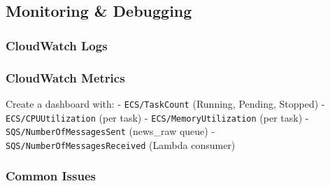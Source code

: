 \hypertarget{monitoring-debugging}{%
\subsection{Monitoring \& Debugging}}

\hypertarget{cloudwatch-logs}{%
\subsubsection{CloudWatch Logs}}

\begin{Shaded}
\begin{Highlighting}[]
  

\DataTypeTok{\textbackslash{}}
  \DataTypeTok{\textbackslash{}}
    \DataTypeTok{\textbackslash{}}
   \VariableTok{$(}  \VariableTok{)}
\end{Highlighting}
\end{Shaded}

\hypertarget{cloudwatch-metrics}{%
\subsubsection{CloudWatch Metrics}}

Create a dashboard with: - \texttt{ECS/TaskCount} (Running, Pending,
Stopped) - \texttt{ECS/CPUUtilization} (per task) -
\texttt{ECS/MemoryUtilization} (per task) -
\texttt{SQS/NumberOfMessagesSent} (news\_raw queue) -
\texttt{SQS/NumberOfMessagesReceived} (Lambda consumer)

\hypertarget{common-issues}{%
\subsubsection{Common Issues}}

